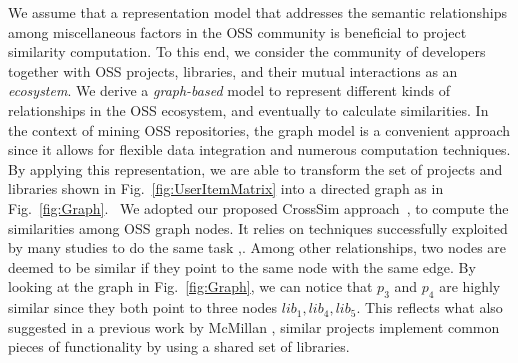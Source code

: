 

We assume that a representation model that addresses the semantic 
relationships among miscellaneous factors in the OSS community is beneficial to 
project similarity computation. To this end, we consider the community of developers together with 
OSS projects, libraries, and their mutual interactions as an 
\textit{ecosystem}. We derive a 
\textit{graph-based} model to represent different kinds of relationships in the OSS ecosystem, and 
eventually to calculate similarities. In the context of mining OSS repositories, the graph model is a convenient approach since it allows for flexible data integration and numerous computation techniques. 
By applying this representation, we are able to transform the set of projects and libraries shown in Fig.~\ref{fig:UserItemMatrix} into a directed graph as in Fig.~\ref{fig:Graph}.
~We adopted our proposed CrossSim approach~\cite{Nguyen:2019:FRS:3339505.3339636},\cite{8498236} to compute the 
similarities among OSS graph nodes. It relies on techniques successfully 
exploited by many studies to do the same task 
\cite{DiNoia:2012:LOD:2362499.2362501},\cite{BRIGUEZ20146467}. Among 
other relationships, two nodes are deemed to be similar if they point to the same node with the same edge. By looking at the graph in 
Fig.~\ref{fig:Graph}, we can notice that $p_3$ and $p_4$ are highly 
similar since they both point to three nodes $lib_{1}, lib_{4}, lib_{5}$.  This 
reflects what also suggested in a previous work by McMillan \etal 
\cite{McMillan:2012:DSS:2337223.2337267}, \ie similar projects implement common 
pieces of functionality by using a shared set of libraries.


